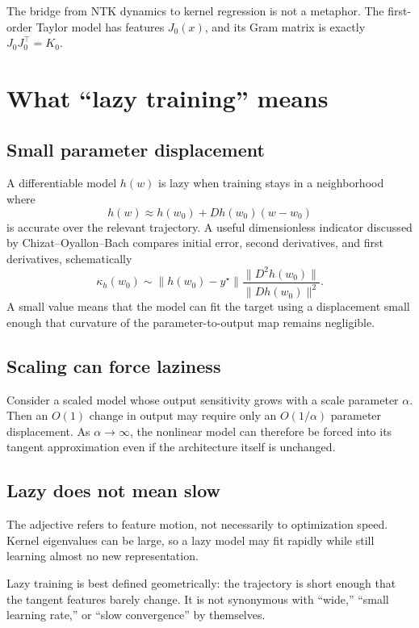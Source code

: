 \documentclass[11pt,a4paper,oneside,openany]{memoir}
\theoremstyle{definition}
\begin{document}
\begin{presentbox}
The bridge from NTK dynamics to kernel regression is not a metaphor.  The first-order Taylor model has features $J_0(x)$, and its Gram matrix is exactly $J_0J_0^\top=K_0$.
\end{presentbox}

\chapter{What ``lazy training'' means}
\section{Small parameter displacement}
A differentiable model $h(w)$ is lazy when training stays in a neighborhood where
\[
h(w)\approx h(w_0)+Dh(w_0)(w-w_0)
\]
is accurate over the relevant trajectory.  A useful dimensionless indicator discussed by Chizat--Oyallon--Bach compares initial error, second derivatives, and first derivatives, schematically
\[
\kappa_h(w_0)
\sim
\|h(w_0)-y^\star\|
\frac{\|D^2h(w_0)\|}{\|Dh(w_0)\|^2}.
\]
A small value means that the model can fit the target using a displacement small enough that curvature of the parameter-to-output map remains negligible.

\section{Scaling can force laziness}
Consider a scaled model whose output sensitivity grows with a scale parameter $\alpha$.  Then an $O(1)$ change in output may require only an $O(1/\alpha)$ parameter displacement.  As $\alpha\to\infty$, the nonlinear model can therefore be forced into its tangent approximation even if the architecture itself is unchanged.

\section{Lazy does not mean slow}
The adjective refers to feature motion, not necessarily to optimization speed.  Kernel eigenvalues can be large, so a lazy model may fit rapidly while still learning almost no new representation.

\begin{presentbox}
Lazy training is best defined geometrically: the trajectory is short enough that the tangent features barely change.  It is not synonymous with ``wide,'' ``small learning rate,'' or ``slow convergence'' by themselves.
\end{presentbox}
\end{document}
